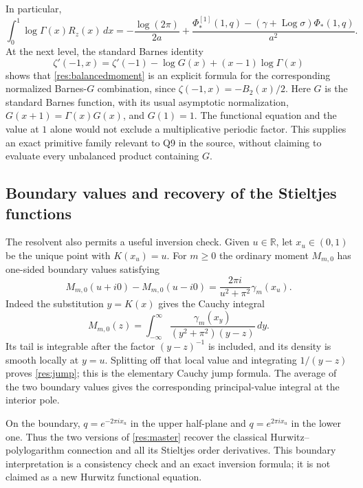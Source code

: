 \documentclass[11pt,a4paper]{article}
\numberwithin{equation}{section}
\theoremstyle{definition}
\theoremstyle{remark}
\DeclareMathOperator{\Log}{Log}
\begin{document}
In particular,
\begin{equation}\label{res:loggammamoment}
 \int_0^1\log\Gamma(x)R_z(x)\,dx
 =-\frac{\log(2\pi)}{2a}
   +\frac{\Phi_*^{[1]}(1,q)
                 -(\gamma+\Log\sigma)\Phi_*(1,q)}{a^2}.
\end{equation}
At the next level, the standard Barnes identity
\cite{Vardi}
\[
 \zeta'(-1,x)=\zeta'(-1)-\log G(x)+(x-1)\log\Gamma(x)
\]
shows that \eqref{res:balancedmoment} is an explicit formula for
the corresponding normalized Barnes-$G$ combination, since
$\zeta(-1,x)=-B_2(x)/2$. Here $G$ is the standard Barnes function, with its usual asymptotic
normalization, $G(x+1)=\Gamma(x)G(x)$, and $G(1)=1$. The
functional equation and the value at $1$ alone would not exclude
a multiplicative periodic factor. This supplies an exact primitive
family relevant to Q9 in the source, without claiming to evaluate
every unbalanced product containing $G$.

\subsection{Boundary values and recovery of the Stieltjes functions}

The resolvent also permits a useful inversion check. Given
$u\in\mathbb R$, let $x_u\in(0,1)$ be the unique point with
$K(x_u)=u$. For $m\ge0$ the ordinary moment $M_{m,0}$ has
one-sided boundary values satisfying
\begin{equation}\label{res:jump}
 M_{m,0}(u+i0)-M_{m,0}(u-i0)
       =\frac{2\pi i}{u^2+\pi^2}\gamma_m(x_u).
\end{equation}
Indeed the substitution $y=K(x)$ gives the Cauchy integral
\[
 M_{m,0}(z)=\int_{-\infty}^{\infty}
      \frac{\gamma_m(x_y)}{(y^2+\pi^2)(y-z)}\,dy.
\]
Its tail is integrable after the factor $(y-z)^{-1}$ is included,
and its density is smooth locally at $y=u$. Splitting off that
local value and integrating $1/(y-z)$ proves
\eqref{res:jump}; this is the elementary Cauchy jump formula.
The average of the two boundary values gives the corresponding
principal-value integral at the interior pole.

On the boundary, $q=e^{-2\pi ix_u}$ in the upper half-plane and
$q=e^{2\pi ix_u}$ in the lower one. Thus the two versions of
\eqref{res:master} recover the classical Hurwitz--polylogarithm
connection and all its Stieltjes order derivatives. This boundary
interpretation is a consistency check and an exact inversion formula;
it is not claimed as a new Hurwitz functional equation.
\end{document}
